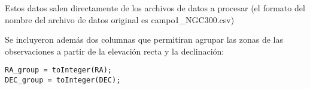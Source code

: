 \documentclass[a4paper,headsepline,footsepline,draft=false]{scrartcl}
\begin{document}
Estos datos salen directamente de los archivos de datos a procesar (el formato del nombre del archivo de datos original es campo1\_NGC300.csv)

Se incluyeron además dos columnas que permitiran agrupar las zonas de las observaciones a partir de la elevación recta y la declinación:

\begin{lstlisting}[caption={Creación de los grupos de elevación y declinación},captionpos=b,frame=shadowbox]
RA_group = toInteger(RA);
DEC_group = toInteger(DEC);
\end{lstlisting}

%
%
%
%
\end{document}
